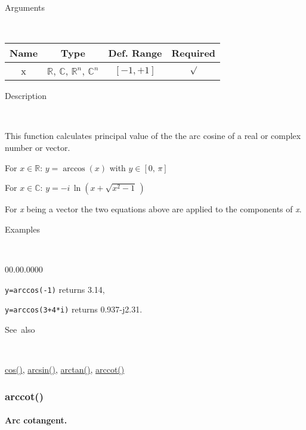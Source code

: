 \begin{description}
\item [Arguments]~
\end{description}
\begin{tabular}{|c|c|c|c|}
\hline 
Name&
Type&
Def. Range&
Required\tabularnewline
\hline
\hline 
x&
$\mathbb{R}$, $\mathbb{C}$, $\mathbb{R}^{n}$, $\mathbb{C}^{n}$&
$\left[-1,+1\right]$&
$\surd$\tabularnewline
\hline
\end{tabular}

\begin{description}
\item [Description]~
\end{description}
This function calculates principal value of the the arc cosine of
a real or complex number or vector.

\medskip{}
For $x\in\mathbb{R}$: $y=\arccos\left(x\right)$ with $y\in\left[0,\,\pi\right]$

\medskip{}
For $x\in\mathbb{C}$: $y=-i\,\ln\left(x+\sqrt{x^{2}-1}\,\right)$
\medskip{}

\noindent For \textit{x} being a vector the two equations above are
applied to the components of \textit{x}.

\begin{description}
\item [Examples]~
\end{description}
\begin{lyxlist}{00.00.0000}
\item [\texttt{y=arccos(-1)}]returns 3.14,
\item [\texttt{y=arccos(3+4{*}i)}]returns 0.937-j2.31.
\end{lyxlist}
\begin{description}
\item [See~also]~
\end{description}
\textcolor{blue}{\hyperlink{cos}{cos()}}\textcolor{black}{,} \textcolor{blue}{\hyperlink{arcsin}{arcsin()}}\textcolor{black}{,}
\textcolor{blue}{\hyperlink{arctan}{arctan()}}\textcolor{black}{,}
\textcolor{blue}{\hyperlink{arccot}{arccot()}}


\newpage
\subsubsection*{\hypertarget{arccot}{}{\Large arccot()}}


\paragraph{\label{par:Arc-cotangent}Arc cotangent.}

